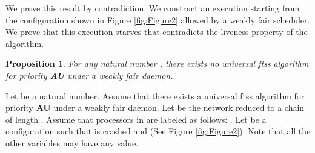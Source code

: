 \documentclass[11pt,english,letterpaper]{article}
\newtheorem{proposition}{Proposition}
\newenvironment{proof}{{\noindent\bf Proof. } }{{\hfill }}
\begin{document}
We prove this result by contradiction. We construct an execution starting from the configuration  shown in Figure \ref{fig:Figure2} allowed by a weakly fair scheduler. We prove that this execution starves  that contradicts the liveness property of the algorithm. 

\begin{proposition}\label{prop:impWFPri}
For any natural number , there exists no universal ftss algorithm for \emph{priority} \textbf{AU} under a weakly fair daemon.
\end{proposition}

\begin{proof}
Let  be a natural number. Assume that there exists a universal ftss algorithm  for priority \textbf{AU} under a weakly fair daemon. Let  be the network reduced to a chain of length . Assume that processors in  are labeled as follows: . Let  be a configuration such that  is crashed and  (See Figure \ref{fig:Figure2}). Note that all the other variables may have any value.


\end{proof}
\end{document}
